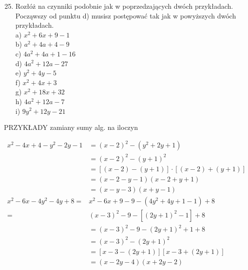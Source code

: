 \documentclass[10pt]{article}
\begin{document}
\begin{enumerate}
  \setcounter{enumi}{24}
  \item Rozłóż na czynniki podobnie jak w poprzedzających dwóch przykładach. Począwszy od punktu d) musisz postępować tak jak w powyższych dwóch przykładach.\\
a) \(x^{2}+6 x+9-1\)\\
b) \(a^{2}+4 a+4-9\)\\
c) \(4 a^{2}+4 a+1-16\)\\
d) \(4 a^{2}+12 a-27\)\\
e) \(y^{2}+4 y-5\)\\
f) \(x^{2}+4 x+3\)\\
g) \(x^{2}+18 x+32\)\\
h) \(4 a^{2}+12 a-7\)\\
i) \(9 y^{2}+12 y-21\)
\end{enumerate}

PRZYKŁADY zamiany sumy alg. na iloczyn

\[
\begin{aligned}
x^{2}-4 x+4-y^{2}-2 y-1 & =(x-2)^{2}-\left(y^{2}+2 y+1\right) \\
& =(x-2)^{2}-(y+1)^{2} \\
& =[(x-2)-(y+1)] \cdot[(x-2)+(y+1)] \\
& =(x-2-y-1)(x-2+y+1) \\
& =(x-y-3)(x+y-1) \\
x^{2}-6 x-4 y^{2}-4 y+8= & x^{2}-6 x+9-9-\left(4 y^{2}+4 y+1-1\right)+8 \\
= & (x-3)^{2}-9-\left[(2 y+1)^{2}-1\right]+8 \\
& =(x-3)^{2}-9-(2 y+1)^{2}+1+8 \\
& =(x-3)^{2}-(2 y+1)^{2} \\
& =[x-3-(2 y+1)][x-3+(2 y+1)] \\
& =(x-2 y-4)(x+2 y-2)
\end{aligned}
\]
\end{document}
